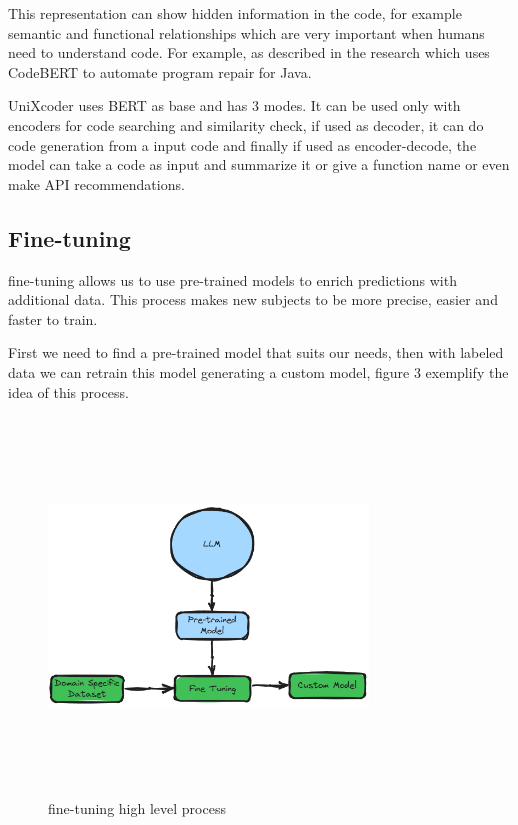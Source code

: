 \documentclass[conference]{IEEEtran}
\begin{document}
This representation can show hidden information in the code, for example semantic and functional relationships which are very important when humans need to understand code.
For example, as described in the research \cite{9463106} which uses CodeBERT\cite{feng-etal-2020-codebert} to automate program repair for Java. 

UniXcoder uses BERT as base and has 3 modes. It can be used only with encoders for code searching and similarity check, if used as decoder, it can do code generation from a input code and finally if used as encoder-decode, the model can take a code as input and summarize it or give a function name or even make API recommendations.

\subsection{Fine-tuning}

fine-tuning allows us to use pre-trained models to enrich predictions with additional data.
This process makes new subjects to be more precise, easier and faster to train. 

First we need to find a pre-trained model that suits our needs, then with labeled data we can retrain this model generating a custom model, figure 3 exemplify the idea of this process.

\begin{figure}[ht]
    \centering
    \includegraphics[width=8.5cm, height=10cm]{./imgs/fine-tuning.png}
    \caption{fine-tuning high level process}
\end{figure}
\end{document}
